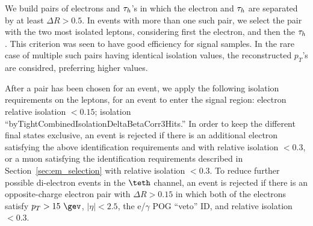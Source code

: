 We build pairs of electrons and $\tau_h$'s in which the electron and
$\tau_h$ are separated by at least $\Delta R > 0.5$.  In events with
more than one such pair, we select the pair with the two most isolated
leptons, considering first the electron, and then the $\tau_h$.  This
criterion was seen to have good efficiency for signal samples.  In the
rare case of multiple such pairs having identical isolation values,
the reconstructed $p_T$'s are considred, preferring higher values.


After a pair has been chosen for an event, we apply the following
isolation requirements on the leptons, for an event to enter the
signal region: electron relative isolation $<0.15$; \tauh isolation
``byTightCombinedIsolationDeltaBetaCorr3Hits.''  In order to keep the
different final states exclusive, an event is rejected if there is an
additional electron satisfying the above identification requirements
and with relative isolation $<0.3$, or a muon satisfying the
identification requirements described in
Section~\ref{sec:em_selection} with relative isolation $<0.3$.  To
reduce further possible di-electron events in the $\teth$ channel, an
event is rejected if there is an opposite-charge electron pair with
$\Delta R > 0.15$ in which both of the electrons satisfy $p_T >
15~\gev$, $\vert \eta \vert < 2.5$, the e/$\gamma$ POG ``veto'' ID,
and relative isolation $<0.3$.

